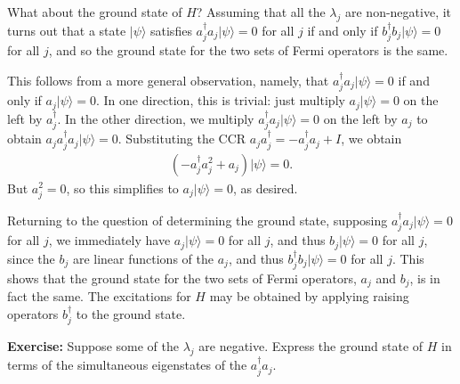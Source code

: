 \documentclass[12pt]{article}
\begin{document}
What about the ground state of $H$?  Assuming that all the $\lambda_j$
are non-negative, it turns out that a state $|\psi\rangle$ satisfies
$a_j^\dagger a_j |\psi\rangle = 0$ for all $j$ if and only if
$b_j^\dagger b_j|\psi\rangle = 0$ for all $j$, and so the ground state
for the two sets of Fermi operators is the same.


This follows from a more general observation, namely, that
$a_j^\dagger a_j |\psi\rangle = 0$ if and only if $a_j|\psi\rangle =
0$.  In one direction, this is trivial: just multiply $a_j|\psi\rangle
= 0$ on the left by $a_j^\dagger$.  In the other direction, we
multiply $a_j^\dagger a_j |\psi\rangle = 0$ on the left by $a_j$ to
obtain $a_j a_j^\dagger a_j |\psi\rangle = 0$.  Substituting the CCR
$a_j a_j^\dagger = -a_j^\dagger a_j + I$, we obtain
\begin{eqnarray}
  (-a_j^\dagger a_j^2+a_j)|\psi\rangle = 0.
\end{eqnarray}
But $a_j^2 = 0$, so this simplifies to $a_j|\psi\rangle = 0$, as
desired.

Returning to the question of determining the ground state, supposing
$a_j^\dagger a_j|\psi\rangle = 0$ for all $j$, we immediately have
$a_j|\psi\rangle = 0$ for all $j$, and thus $b_j|\psi\rangle = 0$ for
all $j$, since the $b_j$ are linear functions of the $a_j$, and thus
$b_j^\dagger b_j|\psi\rangle = 0$ for all $j$.  This shows that the
ground state for the two sets of Fermi operators, $a_j$ and $b_j$, is
in fact the same.  The excitations for $H$ may be obtained by applying
raising operators $b_j^\dagger$ to the ground state.

\textbf{Exercise:} Suppose some of the $\lambda_j$ are negative.
Express the ground state of $H$ in terms of the simultaneous
eigenstates of the $a_j^\dagger a_j$.



\end{document}
